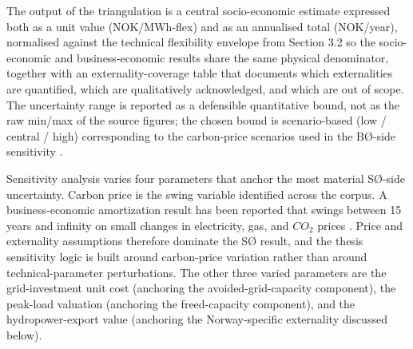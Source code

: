 The output of the triangulation is a central socio-economic estimate expressed both as a unit value (NOK/MWh-flex) and as an annualised total (NOK/year), normalised against the technical flexibility envelope from Section 3.2 so the socio-economic and business-economic results share the same physical denominator, together with an externality-coverage table that documents which externalities are quantified, which are qualitatively acknowledged, and which are out of scope. The uncertainty range is reported as a defensible quantitative bound, not as the raw min/max of the source figures; the chosen bound is scenario-based (low / central / high) corresponding to the carbon-price scenarios used in the BØ-side sensitivity .

Sensitivity analysis varies four parameters that anchor the most material SØ-side uncertainty. Carbon price is the swing variable identified across the corpus. A business-economic amortization result has been reported that swings between 15 years and infinity on small changes in electricity, gas, and $CO_2$ prices \cite{moser_socioeconomic_2018}.  Price and externality assumptions therefore dominate the SØ result, and the thesis sensitivity logic is built around carbon-price variation rather than around technical-parameter perturbations. The other three varied parameters are the grid-investment unit cost (anchoring the avoided-grid-capacity component), the peak-load valuation (anchoring the freed-capacity component), and the hydropower-export value (anchoring the Norway-specific externality discussed below).

